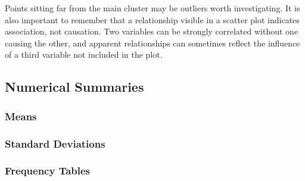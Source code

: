 \documentclass[
  letterpaper,
  DIV=11,
  numbers=noendperiod]{scrartcl}
\begin{document}
Points sitting far from the main cluster may be outliers worth
investigating. It is also important to remember that a relationship
visible in a scatter plot indicates association, not causation. Two
variables can be strongly correlated without one causing the other, and
apparent relationships can sometimes reflect the influence of a third
variable not included in the plot.

\subsection{Numerical Summaries}\label{numerical-summaries}

\subsubsection{Means}\label{means}

\subsubsection{Standard Deviations}\label{standard-deviations}

\subsubsection{Frequency Tables}\label{frequency-tables}
\end{document}
